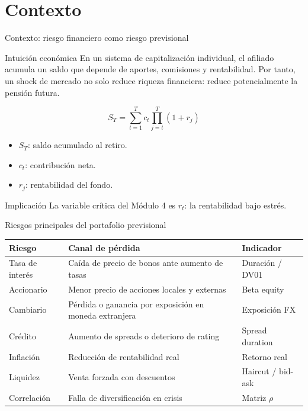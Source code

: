 \documentclass[aspectratio=169,11pt]{beamer}
\begin{document}
\section{Contexto}

\begin{frame}{Contexto: riesgo financiero como riesgo previsional}
\begin{block}{Intuición económica}
En un sistema de capitalización individual, el afiliado acumula un saldo que depende de aportes, comisiones y rentabilidad. Por tanto, un shock de mercado no solo reduce riqueza financiera: reduce potencialmente la pensión futura.
\end{block}

\[
S_T=\sum_{t=1}^{T} c_t \prod_{j=t}^{T}(1+r_j)
\]

\begin{itemize}
  \item $S_T$: saldo acumulado al retiro.
  \item $c_t$: contribución neta.
  \item $r_j$: rentabilidad del fondo.
\end{itemize}

\begin{alertblock}{Implicación}
La variable crítica del Módulo 4 es $r_t$: la rentabilidad bajo estrés.
\end{alertblock}
\end{frame}

\begin{frame}{Riesgos principales del portafolio previsional}
\begin{table}
\centering
\small
\begin{tabular}{p{} p{} p{}}
\toprule
\textbf{Riesgo} & \textbf{Canal de pérdida} & \textbf{Indicador} \\
\midrule
Tasa de interés & Caída de precio de bonos ante aumento de tasas & Duración / DV01 \\
Accionario & Menor precio de acciones locales y externas & Beta equity \\
Cambiario & Pérdida o ganancia por exposición en moneda extranjera & Exposición FX \\
Crédito & Aumento de spreads o deterioro de rating & Spread duration \\
Inflación & Reducción de rentabilidad real & Retorno real \\
Liquidez & Venta forzada con descuentos & Haircut / bid-ask \\
Correlación & Falla de diversificación en crisis & Matriz $\rho$ \\
\bottomrule
\end{tabular}
\end{table}
\end{frame}
\end{document}
